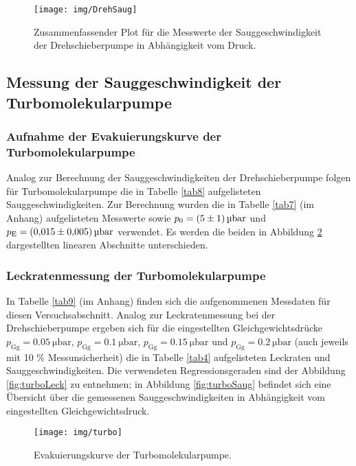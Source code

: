 \begin{figure}
	\centering
	\texttt{[image: img/DrehSaug]}
	\caption{Zusammenfassender Plot für die Messwerte der Sauggeschwindigkeit der Drehschieberpumpe in Abhängigkeit vom Druck.}
	\label{fig:drehSaug}
\end{figure}


\subsection{Messung der Sauggeschwindigkeit der Turbomolekularpumpe}

\subsubsection{Aufnahme der Evakuierungskurve der Turbomolekularpumpe}

Analog zur Berechnung der Sauggeschwindigkeiten der Drehschieberpumpe folgen für Turbomolekularpumpe die in Tabelle \ref{tab8} aufgelisteten Sauggeschwindigkeiten. Zur Berechnung wurden die in Tabelle \ref{tab7} (im Anhang) aufgelisteten Messwerte sowie $p_0 = \SI{5 +- 1}{\micro \bar}$ und $p_\text{E} = \SI{0.015 +- 0.005}{\micro \bar}$ verwendet. Es werden die beiden in Abbildung \ref{fig:turbo} dargestellten linearen Abschnitte unterschieden. 

\subsubsection{Leckratenmessung der Turbomolekularpumpe}

In Tabelle \ref{tab9} (im Anhang) finden sich die aufgenommenen Messdaten für diesen Versuchsabschnitt. Analog zur Leckratenmessung bei der Drehschieberpumpe ergeben sich für die eingestellten Gleichgewichtsdrücke $p_\text{Gg} = \SI{0.05}{\micro \bar}$, $p_\text{Gg} = \SI{0.1}{\micro \bar}$, $p_\text{Gg} = \SI{0.15}{\micro \bar}$ und $p_\text{Gg} = \SI{0.2}{\micro \bar}$ (auch jeweils mit 10 \% Messunsicherheit) die in Tabelle \ref{tab4} aufgelisteten Leckraten und Sauggeschwindigkeiten. Die verwendeten Regressionsgeraden sind der Abbildung \ref{fig:turboLeck} zu entnehmen; in Abbildung \ref{fig:turboSaug} befindet sich eine Übersicht über die gemessenen Sauggeschwindigkeiten in Abhängigkeit vom eingestellten Gleichgewichtsdruck.




	 
\begin{figure}
	\centering
	\texttt{[image: img/turbo]}
	\caption{Evakuierungskurve der Turbomolekularpumpe.}
	\label{fig:turbo}
\end{figure}

